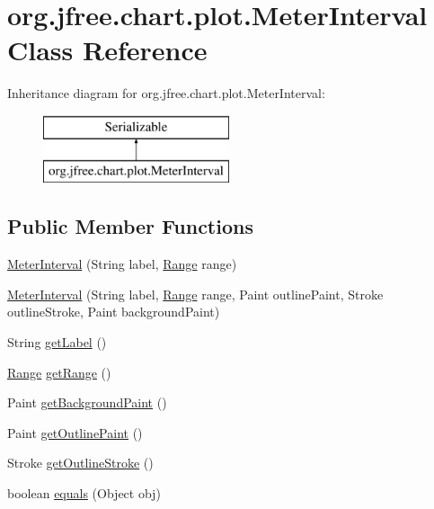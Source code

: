 \hypertarget{classorg_1_1jfree_1_1chart_1_1plot_1_1_meter_interval}{}\section{org.\+jfree.\+chart.\+plot.\+Meter\+Interval Class Reference}
\label{classorg_1_1jfree_1_1chart_1_1plot_1_1_meter_interval}
Inheritance diagram for org.\+jfree.\+chart.\+plot.\+Meter\+Interval\+:\begin{figure}[H]
\begin{center}
\leavevmode
\includegraphics[height=2.000000cm]{classorg_1_1jfree_1_1chart_1_1plot_1_1_meter_interval}
\end{center}
\end{figure}
\subsection*{Public Member Functions}
\begin{DoxyCompactItemize}
\item 
\mbox{\hyperlink{classorg_1_1jfree_1_1chart_1_1plot_1_1_meter_interval_a014870769e390ba0157e1a2ab1624523}{Meter\+Interval}} (String label, \mbox{\hyperlink{classorg_1_1jfree_1_1data_1_1_range}{Range}} range)
\item 
\mbox{\hyperlink{classorg_1_1jfree_1_1chart_1_1plot_1_1_meter_interval_a3eea3120fd6f5807b131ccb883143955}{Meter\+Interval}} (String label, \mbox{\hyperlink{classorg_1_1jfree_1_1data_1_1_range}{Range}} range, Paint outline\+Paint, Stroke outline\+Stroke, Paint background\+Paint)
\item 
String \mbox{\hyperlink{classorg_1_1jfree_1_1chart_1_1plot_1_1_meter_interval_a4eb9f7270ace06134402dc95dece1799}{get\+Label}} ()
\item 
\mbox{\hyperlink{classorg_1_1jfree_1_1data_1_1_range}{Range}} \mbox{\hyperlink{classorg_1_1jfree_1_1chart_1_1plot_1_1_meter_interval_aee6cd3f6ab8e6f86a9517184164f6125}{get\+Range}} ()
\item 
Paint \mbox{\hyperlink{classorg_1_1jfree_1_1chart_1_1plot_1_1_meter_interval_a1ebb692861ec8c40c5a3b3882e16fd0a}{get\+Background\+Paint}} ()
\item 
Paint \mbox{\hyperlink{classorg_1_1jfree_1_1chart_1_1plot_1_1_meter_interval_a6e6b1537121120fa27450043a72ba700}{get\+Outline\+Paint}} ()
\item 
Stroke \mbox{\hyperlink{classorg_1_1jfree_1_1chart_1_1plot_1_1_meter_interval_aa35b1c0737d4f8c7dbc8e631fb885bf2}{get\+Outline\+Stroke}} ()
\item 
boolean \mbox{\hyperlink{classorg_1_1jfree_1_1chart_1_1plot_1_1_meter_interval_aa891ec22df74f65f9e0370656ff9b357}{equals}} (Object obj)
\end{DoxyCompactItemize}


